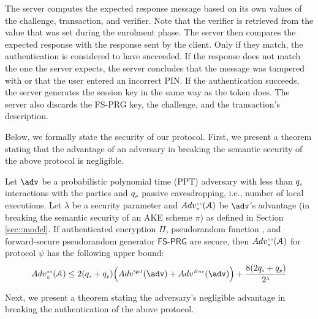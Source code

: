 The server computes the expected response message based on its own values of the challenge, transaction, and verifier. Note that the verifier is retrieved from the value that was set during the enrolment phase. The server then compares the expected response with the response sent by the client. Only if they match, the authentication is considered to have succeeded. If the response does not match the one the server expects, the server concludes that the message was tampered with or that the user entered an incorrect PIN. If the authentication succeeds, the server generates the session key in the same way as the token does.  The server also discards the FS-PRG key, the challenge, and the transaction's description.

%
Below, we formally state the security of our protocol.  First, we present a theorem stating that the advantage of an adversary in breaking the semantic security of the above protocol is negligible.  
\begin{theorem}[Semantic Security]
Let $\adv$ be a probabilistic polynomial time (PPT) adversary with less than $q_{\scriptscriptstyle s}$ interactions with the parties and $q_{\scriptscriptstyle p}$ passive eavesdropping, i.e., number of local executions. Let $\lambda$ be a security parameter and $Adv_{\scriptscriptstyle\pi}^{\scriptscriptstyle ss}(\mathcal{A})$ be  $\adv$'s advantage (in breaking the semantic security of an AKE scheme $\pi$) as defined in Section \ref{sec::model}. If authenticated encryption $\Pi$, pseudorandom function \prf,  and forward-secure pseudorandom generator  $\mathsf{FS\text{-}PRG}$ are secure, then $Adv_{\scriptscriptstyle\pi}^{\scriptscriptstyle ss}(\mathcal{A})$ for protocol $\psi$ has the following upper bound:  
%
\begin{equation*} 
Adv_{\sss \psi}^{\sss ss}(\A) \leq 2(q_{\sss s}+q_{\sss p})\Big(Adv^{\sss\prf}(\adv)+Adv^{\sss Enc}(\adv)\Big)+\frac{8(2q_{\sss s}+q_{\sss p})}{2^{\sss\lambda}}
\end{equation*}
%
\end{theorem}

Next, we present a theorem stating the adversary's negligible advantage in breaking the authentication of the above protocol.



